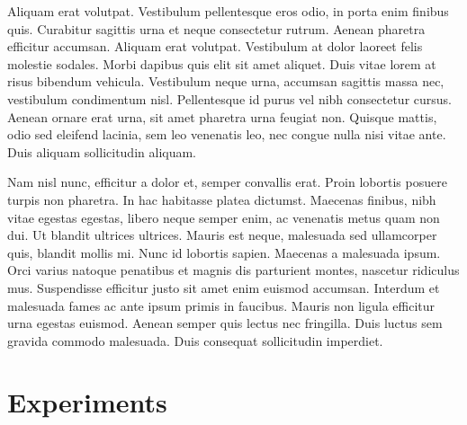 \documentclass[10pt,twocolumn,letterpaper]{article}
\begin{document}
Aliquam erat volutpat. Vestibulum pellentesque eros odio, in porta enim finibus quis. Curabitur sagittis urna et neque consectetur rutrum. Aenean pharetra efficitur accumsan. Aliquam erat volutpat. Vestibulum at dolor laoreet felis molestie sodales. Morbi dapibus quis elit sit amet aliquet. Duis vitae lorem at risus bibendum vehicula. Vestibulum neque urna, accumsan sagittis massa nec, vestibulum condimentum nisl. Pellentesque id purus vel nibh consectetur cursus. Aenean ornare erat urna, sit amet pharetra urna feugiat non. Quisque mattis, odio sed eleifend lacinia, sem leo venenatis leo, nec congue nulla nisi vitae ante. Duis aliquam sollicitudin aliquam.

Nam nisl nunc, efficitur a dolor et, semper convallis erat. Proin lobortis posuere turpis non pharetra. In hac habitasse platea dictumst. Maecenas finibus, nibh vitae egestas egestas, libero neque semper enim, ac venenatis metus quam non dui. Ut blandit ultrices ultrices. Mauris est neque, malesuada sed ullamcorper quis, blandit mollis mi. Nunc id lobortis sapien. Maecenas a malesuada ipsum. Orci varius natoque penatibus et magnis dis parturient montes, nascetur ridiculus mus. Suspendisse efficitur justo sit amet enim euismod accumsan. Interdum et malesuada fames ac ante ipsum primis in faucibus. Mauris non ligula efficitur urna egestas euismod. Aenean semper quis lectus nec fringilla. Duis luctus sem gravida commodo malesuada. Duis consequat sollicitudin imperdiet.

\section{Experiments}


{\small


}
\end{document}
